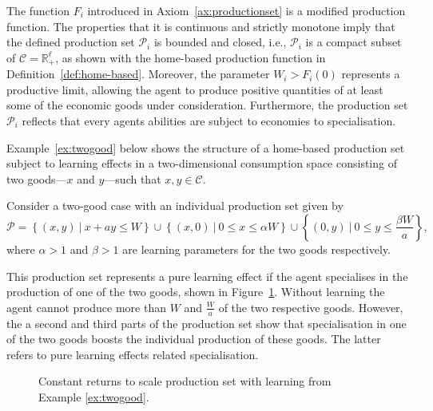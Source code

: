 The function $F_i$ introduced in Axiom~\ref{ax:productionset} is a modified production function. The properties that it is continuous and strictly monotone imply that the defined production set $\mathcal{P}_i$ is bounded and closed, i.e., $\mathcal{P}_i$ is a compact subset of $\mathcal{C} = \mathbb{R}_{+}^{\ell}$, as shown with the home-based production function in Definition~\ref{def:home-based}. Moreover, the parameter $W_{i} > F_{i}(0)$ represents a productive limit, allowing the agent to produce positive quantities of at least some of the economic goods under consideration. Furthermore, the production set $\mathcal{P}_i$ reflects that every agents abilities are subject to economies to specialisation.

Example~\ref{ex:twogood} below shows the structure of a home-based production set subject to learning effects in a two-dimensional consumption space consisting of two goods---$x$ and $y$---such that $x,y \in \mathcal{C}$.

\begin{example} \label{ex:twogood}
Consider a two-good case with an individual production set given by
\begin{equation}
\mathcal{P} = \left\{ (x,y) ~ | ~ x + ay \leqslant W \right\} \cup \left\{ (x,0) ~ | ~ 0 \leqslant x \leqslant \alpha W \right\} \cup \left\{ (0,y) ~ | ~ 0 \leqslant y \leqslant \frac{\beta W}{a} \right\} ,
\end{equation}
where $\alpha > 1$ and $\beta > 1$ are learning parameters for the two goods respectively.

This production set represents a pure learning effect if the agent specialises in the production of one of the two goods, shown in Figure~\ref{fig:production}. Without learning the agent cannot produce more than $W$ and $\frac{W}{a}$ of the two respective goods. However, the a second and third parts of the production set show that specialisation in one of the two goods boosts the individual production of these goods. The latter refers to pure learning effects related specialisation.
\end{example}

\begin{figure}[t]
\begin{center}
\end{center}
\caption[Constant returns to scale production set with learning]{Constant returns to scale production set with learning from Example \ref{ex:twogood}.}
\label{fig:production}
\end{figure}

